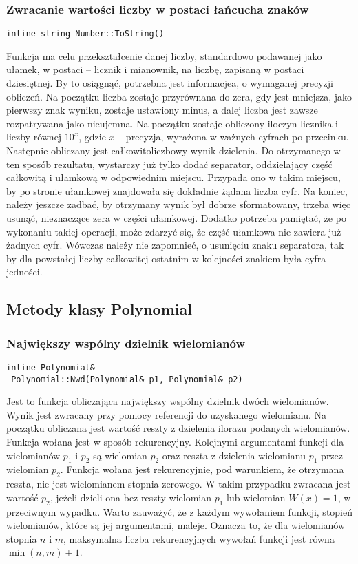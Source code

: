 \subsubsection{Zwracanie wartości liczby w postaci łańcucha znaków}
\begin{lstlisting}
inline string Number::ToString()
\end{lstlisting}

Funkcja ma celu przekształcenie danej liczby, standardowo podawanej jako ułamek, w postaci -- licznik i mianownik, na liczbę, zapisaną w postaci dziesiętnej. By to osiągnąć, potrzebna jest informacjea, o wymaganej precyzji obliczeń. Na początku liczba zostaje przyrównana do zera, gdy jest mniejsza, jako pierwszy znak wyniku, zostaje ustawiony minus, a dalej liczba jest zawsze rozpatrywana jako nieujemna. Na początku zostaje obliczony iloczyn licznika i liczby równej $10^x$, gdzie $x$ -- precyzja, wyrażona w ważnych cyfrach po przecinku. Następnie obliczany jest całkowitoliczbowy wynik dzielenia. Do otrzymanego w ten sposób rezultatu, wystarczy już tylko dodać separator, oddzielający część całkowitą i ułamkową w odpowiednim miejscu. Przypada ono w takim miejscu, by po stronie ułamkowej znajdowała się dokładnie żądana liczba cyfr. Na koniec, należy jeszcze zadbać, by otrzymany wynik był dobrze sformatowany, trzeba więc usunąć, nieznaczące zera w części ułamkowej. Dodatko potrzeba pamiętać, że po wykonaniu takiej operacji, może zdarzyć się, że część ułamkowa nie zawiera już żadnych cyfr. Wówczas należy nie zapomnieć, o usunięciu znaku separatora, tak by dla powstałej liczby całkowitej ostatnim w kolejności znakiem była cyfra jedności.

\subsection{Metody klasy Polynomial}

\subsubsection{Największy wspólny dzielnik wielomianów}
\begin{lstlisting}
inline Polynomial&
 Polynomial::Nwd(Polynomial& p1, Polynomial& p2)
\end{lstlisting}

Jest to funkcja obliczająca największy wspólny dzielnik dwóch wielomianów. Wynik jest zwracany przy pomocy referencji do uzyskanego wielomianu. Na początku obliczana jest wartość reszty z dzielenia ilorazu podanych wielomianów. Funkcja wołana jest w sposób rekurencyjny. Kolejnymi argumentami funkcji dla wielomianów $p_1$ i $p_2$ są wielomian $p_2$ oraz reszta z dzielenia wielomianu $p_1$ przez wielomian $p_2$. Funkcja wołana jest rekurencyjnie, pod warunkiem, że otrzymana reszta, nie jest wielomianem stopnia zerowego. W takim przypadku zwracana jest wartość $p_2$, jeżeli dzieli ona bez reszty wielomian $p_1$ lub wielomian $W(x)=1$, w przeciwnym wypadku. Warto zauważyć, że z każdym wywołaniem funkcji, stopień wielomianów, które są jej argumentami, maleje. Oznacza to, że dla wielomianów stopnia $n$ i $m$, maksymalna liczba rekurencyjnych wywołań funkcji jest równa $\min(n,m)+1$.

